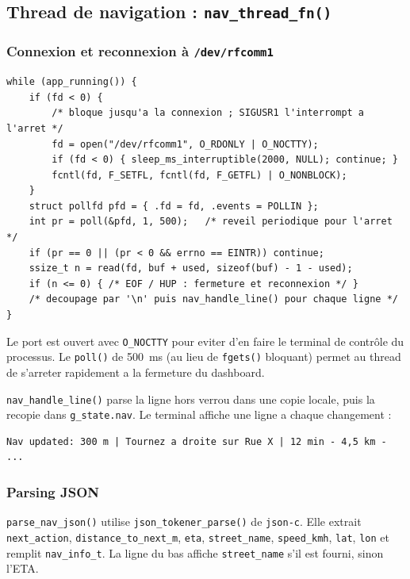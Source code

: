 \documentclass[a4paper,11pt]{article}
\begin{document}
\subsection{Thread de navigation : \texttt{nav\_thread\_fn()}}

\subsubsection{Connexion et reconnexion à \texttt{/dev/rfcomm1}}

\begin{lstlisting}[style=ccode,caption={main.c --- boucle de lecture rfcomm1 (v4)}]
while (app_running()) {
    if (fd < 0) {
        /* bloque jusqu'a la connexion ; SIGUSR1 l'interrompt a l'arret */
        fd = open("/dev/rfcomm1", O_RDONLY | O_NOCTTY);
        if (fd < 0) { sleep_ms_interruptible(2000, NULL); continue; }
        fcntl(fd, F_SETFL, fcntl(fd, F_GETFL) | O_NONBLOCK);
    }
    struct pollfd pfd = { .fd = fd, .events = POLLIN };
    int pr = poll(&pfd, 1, 500);   /* reveil periodique pour l'arret */
    if (pr == 0 || (pr < 0 && errno == EINTR)) continue;
    ssize_t n = read(fd, buf + used, sizeof(buf) - 1 - used);
    if (n <= 0) { /* EOF / HUP : fermeture et reconnexion */ }
    /* decoupage par '\n' puis nav_handle_line() pour chaque ligne */
}
\end{lstlisting}

Le port est ouvert avec \texttt{O\_NOCTTY} pour eviter d'en faire le terminal de
contrôle du processus. Le \texttt{poll()} de 500~ms (au lieu de \texttt{fgets()} bloquant)
permet au thread de s'arreter rapidement a la fermeture du dashboard.

\texttt{nav\_handle\_line()} parse la ligne hors verrou dans une copie locale, puis la
recopie dans \texttt{g\_state.nav}. Le terminal affiche une ligne a chaque changement :

\begin{verbatim}
Nav updated: 300 m | Tournez a droite sur Rue X | 12 min - 4,5 km - ...
\end{verbatim}

\subsubsection{Parsing JSON}

\texttt{parse\_nav\_json()} utilise \texttt{json\_tokener\_parse()} de \texttt{json-c}.
Elle extrait \texttt{next\_action}, \texttt{distance\_to\_next\_m}, \texttt{eta},
\texttt{street\_name}, \texttt{speed\_kmh}, \texttt{lat}, \texttt{lon} et remplit
\texttt{nav\_info\_t}. La ligne du bas affiche \texttt{street\_name} s'il est fourni,
sinon l'ETA.
\end{document}
